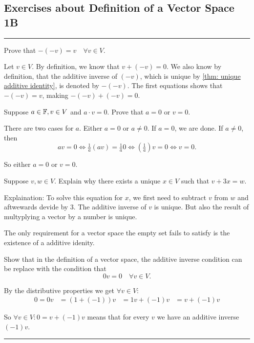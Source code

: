 \subsection*{Exercises about Definition of a Vector Space 1B}
\hrule
\phantom{.}

\begin{xrcs}
  Prove that $-(-v) = v \quad \forall v \in V.$
\end{xrcs}
\begin{prf}
  Let $v \in V$. By definition, we know that $v + (-v) = 0$. We also know by definition, that the additive inverse of $(-v)$, which is unique by \ref{thm: unique additive identity}, is denoted by $-(-v)$. The first equations shows that $-(-v) = v$, making $-(-v) + (-v) = 0$.
\end{prf}

\begin{xrcs}
  Suppose $a \in \mathbb{F}, v \in V$ and $a \cdot v = 0$. Prove that $a=0$ or $v=0$.
\end{xrcs}
\begin{prf}
  There are two cases for $a$. Either $a=0$ or $a\neq 0$. If $a=0$, we are done. If $a \neq 0$, then
  \[
    av=0 \iff \tfrac{1}{a}(av)=\tfrac{1}{a}0 \iff \left(\tfrac{1}{a} \right)v = 0 \iff v = 0.
  \]

  So either $a=0$ or $v=0$.
\end{prf}

\begin{xrcs}
  Suppose $v,w \in V$. Explain why there exists a unique $x \in V$ such that $v + 3x = w$.

  Explaination: To solve this equation for $x$, we first need to subtract $v$ from $w$ and aftwewards devide by $3$. The additive inverse of $v$ is unique. But also the result of multyplying a vector by a number is unique.
\end{xrcs}

\begin{xrcs}
  The only requirement for a vector space the empty set fails to satisfy is the existence of a additive idenity.
\end{xrcs}

\begin{xrcs}
  Show that in the definition of a vector space, the additive inverse condition can be replace with the condition that
  \[
    0v = 0 \quad \forall v \in V.
  \]
\end{xrcs}
\begin{prf}
  By the distributive properties we get $\forall v \in V:$
  \[
  \begin{aligned}
    0 = 0v &= (1 + (-1))v
    &= 1v + (-1)v
    &= v + (-1)v
  \end{aligned}
  \]

  So $\forall v \in V: 0= v + (-1)v$ means that for every $v$ we have an additive inverse $(-1)v$.
\end{prf}
\phantom{.}
\hrule

\clearpage
